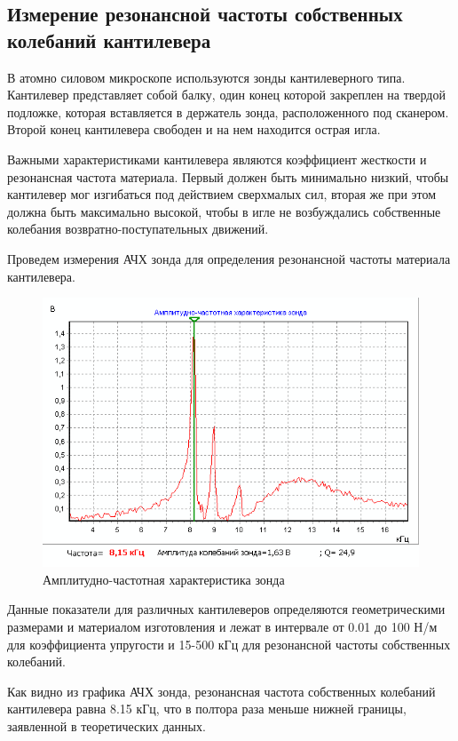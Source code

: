 \documentclass[a4paper, 12pt]{article}
\begin{document}
	\subsection{Измерение резонансной частоты собственных колебаний кантилевера}
	В атомно силовом микроскопе используются зонды кантилеверного типа. Кантилевер представляет собой балку, один конец которой закреплен на твердой подложке, которая вставляется в держатель зонда, расположенного под сканером. Второй конец кантилевера свободен и на нем находится острая игла.\par
	Важными характеристиками кантилевера являются коэффициент жесткости и резонансная частота материала. Первый должен быть минимально низкий, чтобы кантилевер мог изгибаться под действием сверхмалых сил, вторая же при этом должна быть максимально высокой, чтобы в игле не возбуждались собственные колебания возвратно-поступательных движений.\par
	Проведем измерения АЧХ зонда для определения резонансной частоты материала кантилевера.\par
	\begin{figure}[!htb]
		\includegraphics[width=\textwidth]{ach1.PNG}
		\caption{Амплитудно-частотная характеристика зонда}
	\end{figure}
	Данные показатели для различных кантилеверов определяются геометрическими размерами и материалом изготовления и лежат в интервале от 0.01 до 100 Н/м для коэффициента упругости и 15-500 кГц для резонансной частоты собственных колебаний.\par
	Как видно из графика АЧХ зонда, резонансная частота собственных колебаний кантилевера равна 8.15 кГц, что в полтора раза меньше нижней границы, заявленной в теоретических данных.\par
\end{document}
